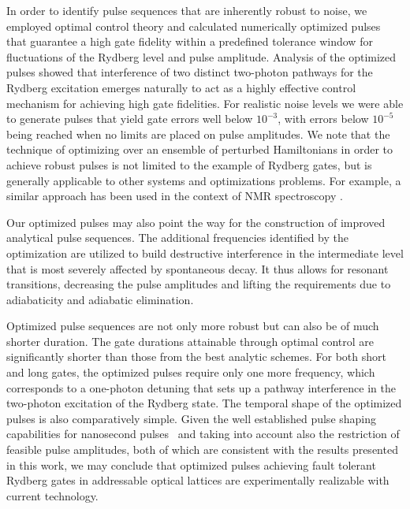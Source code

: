 In order to identify pulse sequences that are inherently robust to
noise, we 
employed optimal control theory and calculated
numerically optimized pulses
that guarantee a high gate fidelity within a predefined tolerance window for fluctuations of
the Rydberg level and pulse amplitude. 
Analysis of the optimized pulses showed that interference of two distinct two-photon pathways 
for the Rydberg excitation emerges naturally to act as a highly effective control mechanism for achieving high gate fidelities. For realistic noise levels we were able to generate
pulses that yield gate errors well below $10^{-3}$,
with errors  below $10^{-5}$ being reached when no limits are placed on
pulse amplitudes.
We note that the technique of optimizing over an
ensemble of perturbed Hamiltonians in order to achieve robust pulses is not
limited to the example of Rydberg gates, but is generally applicable to other
systems and optimizations problems. For example, a similar approach has been
used  in the context of NMR spectroscopy \cite{kobzar2004nmr,kobzar2008nmr}.

Our optimized pulses may also point the way for the construction of
improved analytical pulse sequences. The additional frequencies
identified by the optimization are utilized to build destructive
interference in the intermediate level that is most severely affected
by spontaneous decay. It thus allows for resonant transitions,
decreasing the pulse amplitudes and lifting the requirements due to
adiabaticity and adiabatic elimination.

Optimized pulse sequences are not only more robust but can also be
of much shorter duration. The gate durations attainable through optimal control
are significantly shorter than those from the best analytic schemes.
For both short and long gates, the
optimized pulses require only one more frequency, which corresponds to a
one-photon detuning that sets up a pathway interference in the two-photon excitation of the Rydberg state.  The temporal
shape of the optimized pulses is also comparatively simple. Given the well established pulse shaping
capabilities for nanosecond pulses~\cite{WrightRSI04} and 
taking into account also the restriction of feasible pulse amplitudes, both of which are consistent with the results presented in this work, we may 
conclude that optimized pulses achieving fault
tolerant Rydberg gates in addressable optical lattices are experimentally realizable with current technology.
